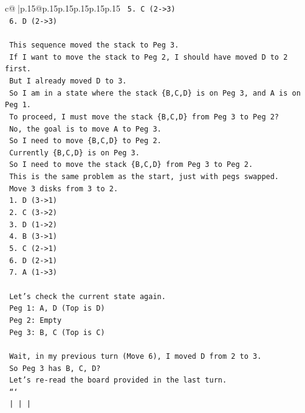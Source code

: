 \documentclass{article}
\begin{document}
{\begin{supertabular}{c@{$\;$}|p{.15\linewidth}@{}p{.15\linewidth}p{.15\linewidth}p{.15\linewidth}p{.15\linewidth}p{.15\linewidth}}
{{{\texttt{    5. C (2{-}>3)} \\
\texttt{    6. D (2{-}>3)} \\
\\ 
\texttt{    This sequence moved the stack to Peg 3.} \\
\texttt{    If I want to move the stack to Peg 2, I should have moved D to 2 first.} \\
\texttt{    But I already moved D to 3.} \\
\texttt{    So I am in a state where the stack \{B,C,D\} is on Peg 3, and A is on Peg 1.} \\
\texttt{    To proceed, I must move the stack \{B,C,D\} from Peg 3 to Peg 2?} \\
\texttt{    No, the goal is to move A to Peg 3.} \\
\texttt{    So I need to move \{B,C,D\} to Peg 2.} \\
\texttt{    Currently \{B,C,D\} is on Peg 3.} \\
\texttt{    So I need to move the stack \{B,C,D\} from Peg 3 to Peg 2.} \\
\texttt{    This is the same problem as the start, just with pegs swapped.} \\
\texttt{    Move 3 disks from 3 to 2.} \\
\texttt{    1. D (3{-}>1)} \\
\texttt{    2. C (3{-}>2)} \\
\texttt{    3. D (1{-}>2)} \\
\texttt{    4. B (3{-}>1)} \\
\texttt{    5. C (2{-}>1)} \\
\texttt{    6. D (2{-}>1)} \\
\texttt{    7. A (1{-}>3)} \\
\\ 
\texttt{    Let's check the current state again.} \\
\texttt{    Peg 1: A, D (Top is D)} \\
\texttt{    Peg 2: Empty} \\
\texttt{    Peg 3: B, C (Top is C)} \\
\\ 
\texttt{    Wait, in my previous turn (Move 6), I moved D from 2 to 3.} \\
\texttt{    So Peg 3 has B, C, D?} \\
\texttt{    Let's re{-}read the board provided in the last turn.} \\
\texttt{    ```} \\
\texttt{        |         |         |    } \\
}}}
\end{supertabular}}
\end{document}
